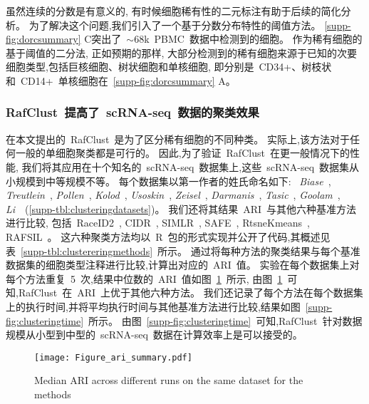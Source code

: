虽然连续的分数是有意义的,
有时候细胞稀有性的二元标注有助于后续的简化分析。
为了解决这个问题,我们引入了一个基于分数分布特性的阈值方法。
\ref{supp-fig:dorcsummary} C突出了~${\sim}68$k~PBMC~数据中检测到的细胞。
作为稀有细胞的基于阈值的二分法,
正如预期的那样,
大部分检测到的稀有细胞来源于已知的次要细胞类型,包括巨核细胞、树状细胞和单核细胞,
即分别是~CD34+、树枝状和~CD14+~单核细胞在~\ref{supp-fig:dorcsummary} A。

\subsubsection{RafClust~提高了~scRNA-seq~数据的聚类效果}

在本文提出的~RafClust~是为了区分稀有细胞的不同种类。
实际上,该方法对于任何一般的单细胞聚类都是可行的。
因此,为了验证~RafClust~在更一般情况下的性能,
我们将其应用在十个知名的~scRNA-seq~数据集上,这些~scRNA-seq~数据集从小规模到中等规模不等。
每个数据集以第一作者的姓氏命名如下: 
~\textit{Biase}~\cite{biase2014cell},
\textit{Treutlein}~\cite{treutlein2014reconstructing}, \textit{Pollen}~\cite{pollen2014low}, 
\textit{Kolod}~\cite{kolodziejczyk2015single}, \textit{Usoskin}~\cite{usoskin2015unbiased}, 
\textit{Zeisel}~\cite{zeisel2015cell}, \textit{Darmanis}~\cite{darmanis2015survey}, 
\textit{Tasic}~\cite{tasic2016adult}, 
\textit{Goolam}~\cite{goolam2016heterogeneity}, 
\textit{Li}~\cite{li2017reference}~(\ref{supp-tbl:clusteringdatasets})。
我们还将其结果~ARI~与其他六种基准方法进行比较,
包括~RaceID2~\cite{grun2016novo}, CIDR~\cite{lin2017cidr}, SIMLR~\cite{wang2018simlr}, SAFE~\cite{yang2018safe}, RtsneKmeans~\cite{hartigan1979algorithm,maaten2008visualizing,van2014accelerating}, RAFSIL~\cite{pouyan2018random}。
这六种聚类方法均以~R~包的形式实现并公开了代码,其概述见表~\ref{supp-tbl:clustereringmethods}~所示。
通过将每种方法的聚类结果与每个基准数据集的细胞类型注释进行比较,计算出对应的~ARI~值。 
实验在每个数据集上对每个方法重复~5~次,结果中位数的~ARI~值如图~\ref{fig:rafari}~所示,
由图~\ref{fig:rafari}~可知,RafClust~在~ARI~上优于其他六种方法。
我们还记录了每个方法在每个数据集上的执行时间,并将平均执行时间与其他基准方法进行比较,结果如图~\ref{supp-fig:clusteringtime}~所示。
由图~\ref{supp-fig:clusteringtime}~可知,RafClust~针对数据规模从小型到中型的~scRNA-seq~数据在计算效率上是可以接受的。

\begin{figure}[!htbp]
    \centering
    \texttt{[image: Figure\_ari\_summary.pdf]}
    \caption{Median ARI across different runs on the same dataset for the methods}
    \label{fig:rafari}
\end{figure}


